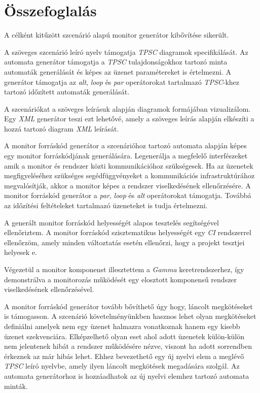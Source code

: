 \chapter{Összefoglalás}

A célként kitűzött szcenárió alapú monitor generátor kibővítése sikerült.

A szöveges szcenárió leíró nyelv támogatja \textit{TPSC} diagramok specifikálását.
Az automata generátor támogatja a \textit{TPSC} tulajdonságokhoz tartozó minta automaták generálását és képes az üzenet paramétereket is értelmezni.
A generátor támogatja az \textit{alt}, \textit{loop} és \textit{par} operátorokat tartalmazó \textit{TPSC}-khez tartozó időzített automaták generálását.

A szcenáriókat a szöveges leírásuk alapján diagramok formájában vizualizálom.
Egy \textit{XML} generátor teszi ezt lehetővé, amely a szöveges leírás alapján elkészíti a hozzá tartozó diagram \textit{XML} leírását.

A monitor forráskód generátor a szcenárióhoz tartozó automata alapján képes egy monitor forráskódjának generálására.
Legenerálja a megfelelő interfészeket amik a monitor és rendszer közti kommunikációhoz szükségesek.
Ha az üzenetek megfigyeléséhez szükséges segédfüggvényeket a kommunikációs infrastruktúrához megvalósítják, akkor a monitor képes a rendszer viselkedésének ellenőrzésére.
A monitor forráskód generátor a \textit{par}, \textit{loop} és \textit{alt} operátorokat támogatja.
Továbbá az időzítési feltételeket tartalmazó üzeneteket is tudja értelmezni.

A generált monitor forráskód helyességét alapos tesztelés segítségével ellenőriztem.
A monitor forráskód szisztematikus helyességét egy \textit{CI} rendszerrel ellenőrzöm, amely minden változtatás esetén ellenőrzi, hogy a projekt tesztjei helyesek e.

Végezetül a monitor komponenst illesztettem a \textit{Gamma} keretrendszerhez, így demonstrálva a monitorozás működését egy elosztott komponensű rendszer viselkedésének ellenőrzésével.

A monitor forráskód generátor tovább bővíthető úgy hogy, láncolt megkötéseket is támogasson.
A szcenárió követelményünkben hasznos lehet olyan megkötéseket definiálni amelyek nem egy üzenet halmazra vonatkoznak hanem egy kisebb üzenet szekvenciára.
Elképzelhető olyan eset ahol adott üzenetek külön-külön nem jelentenek hibát a rendszer működésére nézve, viszont ha adott sorrendben érkeznek az már hibás lehet.
Ehhez bevezethető egy új nyelvi elem a meglévő \textit{TPSC} leíró nyelvbe, amely ilyen láncolt megkötések megadására szolgál.
Az automata generátorhoz is hozzáadhatok az új nyelvi elemhez tartozó automata minták.